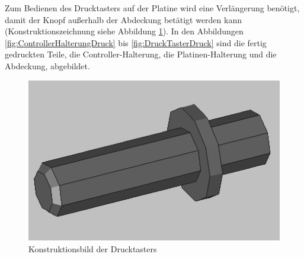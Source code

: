\begin{minipage}[t]{0.54\textwidth}
\indent Zum Bedienen des Drucktasters auf der Platine wird eine Verlängerung benötigt, damit der Knopf außerhalb der Abdeckung betätigt werden kann (Konstruktionszeichnung siehe Abbildung \ref{fig:DruckTasterKonstruktion}). In den Abbildungen \ref{fig:ControllerHalterungDruck} bis \ref{fig:DruckTasterDruck} sind die fertig gedruckten Teile, die Controller-Halterung, die Platinen-Halterung und die Abdeckung, abgebildet.
\end{minipage}
\begin{minipage}[t]{0.4\textwidth}
\vspace{-7mm}
\begin{figure}[H] %
\includegraphics[width=.7\textwidth]{sec2/images/3DAnbaukomponenten/Konstruktionsbilder/DruckTasterKonstruktion} 
\centering
\captionsetup{width=.9\textwidth}
\caption[Konstruktionsbild der Drucktasters]{Konstruktionsbild der Drucktasters}
\centering
\label{fig:DruckTasterKonstruktion}
\end{figure}
\end{minipage}

